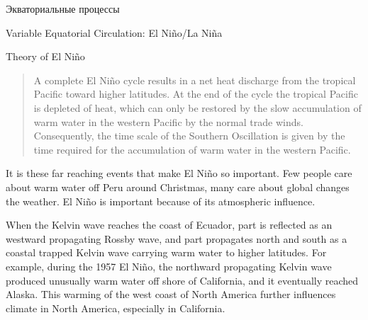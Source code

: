 \begin{chapter}{Экваториальные процессы}
\begin{section}{Variable Equatorial Circulation: El Ni\~{n}o/La Ni\~{n}a}
\begin{paragraph}{Theory of El Ni\~{n}o}
\begin{quote}
A complete El Ni\~{n}o cycle results in a net heat discharge from the
tropical Pacific toward higher latitudes. At the end of the cycle the
tropical Pacific is depleted of heat, which can only be restored by
the slow accumulation of warm water in the western Pacific by the
normal trade winds. Consequently, the time scale of the Southern
Oscillation is given by the time required for the accumulation of warm
water in the western Pacific.
%
\end{quote}

It is these far reaching events that make El Ni\~{n}o so
important. Few people care about warm water off Peru around Christmas,
many care about global changes the weather. El Ni\~{n}o is important
because of its atmospheric influence.
%

When the Kelvin wave reaches the coast of Ecuador,
part is reflected as an westward propagating Rossby
wave, and part propagates north and south as a
coastal trapped Kelvin wave carrying warm water to higher
latitudes. For example, during the 1957 El Ni\~{n}o, the northward
propagating Kelvin wave produced unusually warm water off shore of
California, and it eventually reached Alaska. This warming of the west
coast of North America further influences climate in North America,
especially in California.
%


\end{paragraph}
\end{section}
\end{chapter}
